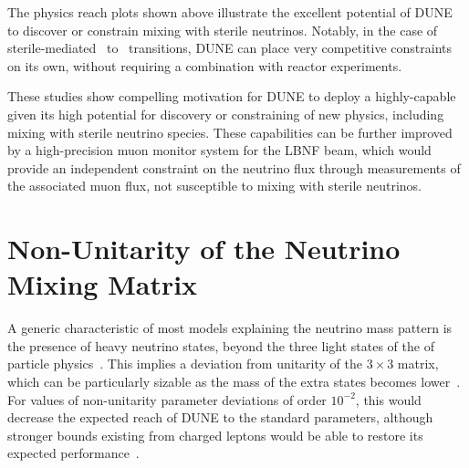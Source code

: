 The physics reach plots shown above illustrate the excellent potential of DUNE to discover or constrain mixing with sterile neutrinos. Notably, in the case of sterile-mediated \numu~to \nue~transitions, DUNE can place very competitive constraints on its own, without requiring a combination with reactor experiments. 

These studies show compelling motivation for DUNE to deploy a highly-capable   given its high potential for discovery or constraining of new physics, including mixing with sterile neutrino species. These capabilities can be further improved by a high-precision muon monitor system for the LBNF beam, which would provide an independent constraint on the neutrino flux through measurements of the associated muon flux, not susceptible to mixing with sterile neutrinos.




\section{Non-Unitarity of the Neutrino Mixing Matrix}
\label{sec:nonUnitarity}
A generic characteristic of most models explaining the neutrino mass
pattern is the presence of heavy neutrino states, beyond the
three light states of the   of particle
physics~\cite{Minkowski:1977sc,Mohapatra:1979ia,Yanagida:1979as,GellMann:1980vs}. This implies a deviation from unitarity of the $3\times3$  matrix, which can be particularly sizable %
as the mass of the extra states becomes lower~\cite{Lee:1977tib,Schechter:1980gr,Mohapatra:1986bd,Akhmedov:1995vm,Akhmedov:1995ip,Malinsky:2005bi}.
For values of non-unitarity parameter deviations of order $10^{-2}$, this would decrease the expected reach of DUNE to the standard parameters, although stronger bounds existing from charged leptons would be able to restore its expected performance~\cite{Blennow:2016jkn,Escrihuela:2016ube}.


